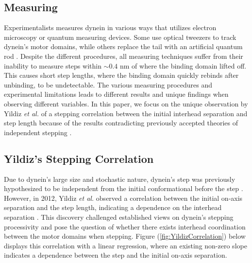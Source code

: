 \subsection{Measuring}

Experimentalists measures dynein in various ways that utilizes electron microscopy or quantum measuring devices. Some use optical tweezers to track dynein's motor domains, while others replace the tail with an artificial quantum rod \cite{kinoshita2018step, Dewitt2012}. Despite the different procedures, all measuring techniques suffer from their inability to measure steps within $\sim 0.4$ nm of where the binding domain lifted off. This causes short step lengths, where the binding domain quickly rebinds after unbinding, to be undetectable. The various measuring procedures and experimental limitations leads to different results and unique findings when observing different variables. In this paper, we focus on the unique observation by Yildiz \textit{et al.} of a stepping correlation between the initial interhead separation and step length because of the results contradicting previously accepted theories of independent stepping \cite{Dewitt2012}. 


\subsection{Yildiz's Stepping Correlation}

Due to dynein's large size and stochastic nature, dynein's step was previously hypothesized to be independent from the initial conformational before the step \cite{wang1995single}. However, in 2012, Yildiz \textit{et al.} observed a correlation between the initial on-axis separation and the step length, indicating a dependence on the interhead separation \cite{Dewitt2012}. This discovery challenged established views on dynein's stepping processivity and pose the question of whether there exists interhead coordination between the motor domains when stepping. Figure (\ref{fig:YildizCorrelation}) below displays this correlation with a linear regression, where an existing non-zero slope indicates a dependence between the step and the initial on-axis separation.

